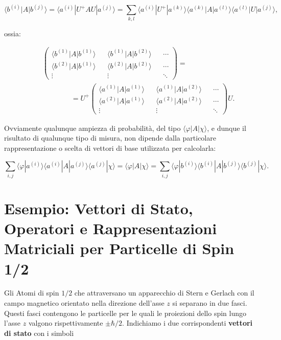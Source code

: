 \documentclass[a4paper,12pt,oneside]{book}
\begin{document}
\begin{equation}
\langle b^{(i)} | A | b^{(j)} \rangle = \langle a^{(i)} |  U^+AU | a^{(j)} \rangle = \sum \limits_{k,l} \langle a^{(i)} | U^+ |a^{(k)} \rangle \langle a^{(k)} | A | a^{(l)} \rangle \langle a^{(l)} | U  | a^{(j)} \rangle ,
\end{equation}

ossia:

\begin{eqnarray}
& &\begin{pmatrix}
\langle b^{(1)} | A | b^{(1)} \rangle  && \langle b^{(1)} | A | b^{(2)} \rangle && \cdots \\
\langle b^{(2)} | A | b^{(1)} \rangle && \langle b^{(2)} | A | b^{(2)} \rangle && \cdots \\
\vdots && \vdots && \ddots
\end{pmatrix} = \nonumber \\
& &\qquad\qquad = U^+
\begin{pmatrix}
\langle a^{(1)} | A | a^{(1)} \rangle && \langle a^{(1)} | A | a^{(2)} \rangle && \cdots \\
\langle a^{(2)} | A | a^{(1)} \rangle && \langle a^{(2)} | A | a^{(2)} \rangle && \cdots \\
\vdots && \vdots && \ddots
\end{pmatrix} U .
\end{eqnarray}

Ovviamente qualunque ampiezza di probabilità, del tipo $ \langle \varphi | A | \chi \rangle $, e dunque il risultato di qualunque tipo di misura, non dipende dalla particolare rappresentazione o scelta di vettori di base utilizzata per calcolarla:

\begin{equation}
\sum \limits_{i,j} \langle \varphi | a^{(i)} \rangle \langle a^{(i)} | A | a^{(j)} \rangle \langle a^{(j)} | \chi \rangle = \langle \varphi | A | \chi \rangle = \sum \limits_{i,j} \langle \varphi | b^{(i)} \rangle \langle b^{(i)} | A | b^{(j)} \rangle \langle b^{(j)} | \chi \rangle .
\end{equation}

\section[Esempio:Particelle di Spin 1/2]{Esempio: Vettori di Stato, Operatori e Rappresentazioni Matriciali per Particelle di Spin 1/2}
Gli Atomi di spin $1/2$ che attraversano un apparecchio di Stern e Gerlach con il campo magnetico orientato nella direzione dell'asse $z$ si separano in due fasci. Questi fasci contengono le particelle per le quali le proiezioni dello spin lungo l'asse $z$ valgono rispettivamente $\pm \hbar/2$. Indichiamo i due corrispondenti \textbf{vettori di stato} con i simboli
\end{document}
